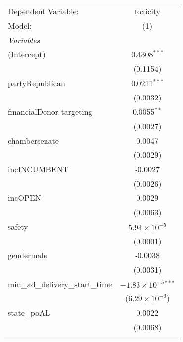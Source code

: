 
\begingroup
\centering
\begin{tabular}{lc}
   \tabularnewline \midrule \midrule
   Dependent Variable:                                & toxicity\\  
   Model:                                             & (1)\\  
   \midrule
   \emph{Variables}\\
   (Intercept)                                        & 0.4308$^{***}$\\   
                                                      & (0.1154)\\   
   partyRepublican                                    & 0.0211$^{***}$\\   
                                                      & (0.0032)\\   
   financialDonor-targeting                           & 0.0055$^{**}$\\   
                                                      & (0.0027)\\   
   chambersenate                                      & 0.0047\\   
                                                      & (0.0029)\\   
   incINCUMBENT                                       & -0.0027\\   
                                                      & (0.0026)\\   
   incOPEN                                            & 0.0029\\   
                                                      & (0.0063)\\   
   safety                                             & $5.94\times 10^{-5}$\\    
                                                      & (0.0001)\\   
   gendermale                                         & -0.0038\\   
                                                      & (0.0031)\\   
   min\_ad\_delivery\_start\_time                     & $-1.83\times 10^{-5}$$^{***}$\\    
                                                      & ($6.29\times 10^{-6}$)\\    
   state\_poAL                                        & 0.0022\\   
                                                      & (0.0068)\\   
$$
\end{tabular}
